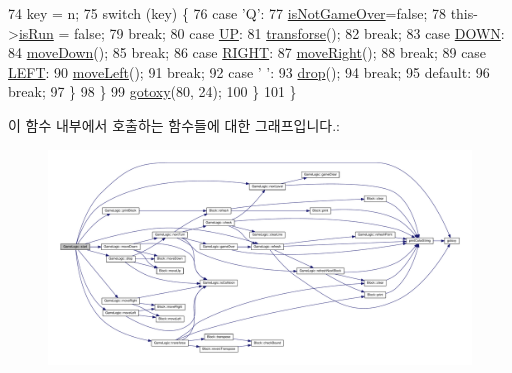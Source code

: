 \begin{DoxyCode}
74             key = n;
75             \textcolor{keywordflow}{switch} (key) \{
76             \textcolor{keywordflow}{case} \textcolor{charliteral}{'Q'}:
77                 \hyperlink{class_game_logic_ae09fc4252ad9db62b810117567783880}{isNotGameOver}=\textcolor{keyword}{false};
78                 this->\hyperlink{class_game_logic_a6a95fb9e16b411f1149dcdb463cdc3a5}{isRun} = \textcolor{keyword}{false};
79                 \textcolor{keywordflow}{break};
80             \textcolor{keywordflow}{case} \hyperlink{_game_logic_8cpp_a1965eaca47dbf3f87acdafc2208f04eb}{UP}:
81                 \hyperlink{class_game_logic_abd2dece64def6dc89e0b116fdca83483}{transforse}();
82                 \textcolor{keywordflow}{break};
83             \textcolor{keywordflow}{case} \hyperlink{_game_logic_8cpp_a4193cd1c8c2e6ebd0e056fa2364a663f}{DOWN}:
84                 \hyperlink{class_game_logic_a36b04a5ca335351249db8cc77019c216}{moveDown}();
85                 \textcolor{keywordflow}{break};
86             \textcolor{keywordflow}{case} \hyperlink{_game_logic_8cpp_a80fb826a684cf3f0d306b22aa100ddac}{RIGHT}:
87                 \hyperlink{class_game_logic_a6213333800f3aa800ea448ad3ee3ea7c}{moveRight}();
88                 \textcolor{keywordflow}{break};
89             \textcolor{keywordflow}{case} \hyperlink{_game_logic_8cpp_a437ef08681e7210d6678427030446a54}{LEFT}:
90                 \hyperlink{class_game_logic_a0e6c1ee03971cf619212f8bb4d5fbc83}{moveLeft}();
91                 \textcolor{keywordflow}{break};
92             \textcolor{keywordflow}{case} \textcolor{charliteral}{' '}:
93                 \hyperlink{class_game_logic_a90faee03fd4311eab796ae7dc582078d}{drop}();
94                 \textcolor{keywordflow}{break};
95             \textcolor{keywordflow}{default}:
96                 \textcolor{keywordflow}{break};
97             \}
98         \}
99         \hyperlink{myio_8cpp_ae824443b3f661414ba1f2718e17fe97d}{gotoxy}(80, 24);
100     \}
101 \}
\end{DoxyCode}


이 함수 내부에서 호출하는 함수들에 대한 그래프입니다.\+:
\nopagebreak
\begin{figure}[H]
\begin{center}
\leavevmode
\includegraphics[width=350pt]{class_game_logic_aeb7d3db8014da87a18ac744d9f77131d_cgraph}
\end{center}
\end{figure}




